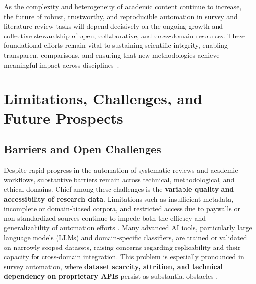 \documentclass[sigconf]{acmart}
\begin{document}
As the complexity and heterogeneity of academic content continue to increase, the future of robust, trustworthy, and reproducible automation in survey and literature review tasks will depend decisively on the ongoing growth and collective stewardship of open, collaborative, and cross-domain resources. These foundational efforts remain vital to sustaining scientific integrity, enabling transparent comparisons, and ensuring that new methodologies achieve meaningful impact across disciplines~\cite{ref26,ref27,ref31,ref32,ref33,ref34,ref35,ref68,ref78,ref80,ref84,ref98,ref100,ref102,ref104,ref106}.

\section{Limitations, Challenges, and Future Prospects}

\subsection{Barriers and Open Challenges}

Despite rapid progress in the automation of systematic reviews and academic workflows, substantive barriers remain across technical, methodological, and ethical domains. Chief among these challenges is the \textbf{variable quality and accessibility of research data}. Limitations such as insufficient metadata, incomplete or domain-biased corpora, and restricted access due to paywalls or non-standardized sources continue to impede both the efficacy and generalizability of automation efforts \cite{ref41,ref42,ref43,ref44,ref54,ref55,ref56,ref57,ref60,ref61,ref62,ref63,ref64,ref65,ref68,ref70,ref71,ref73,ref74,ref75,ref76,ref78,ref80,ref81,ref82,ref83,ref84,ref85,ref86,ref87,ref88,ref89,ref90,ref91,ref92,ref93,ref94,ref95,ref96,ref97,ref98,ref99,ref100,ref103,ref104,ref105,ref106,ref108,ref109,ref110,ref111,ref112,ref113,ref114,ref115,ref117}. Many advanced AI tools, particularly large language models (LLMs) and domain-specific classifiers, are trained or validated on narrowly scoped datasets, raising concerns regarding replicability and their capacity for cross-domain integration. This problem is especially pronounced in survey automation, where \textbf{dataset scarcity, attrition, and technical dependency on proprietary APIs} persist as substantial obstacles \cite{ref117}.
\end{document}

